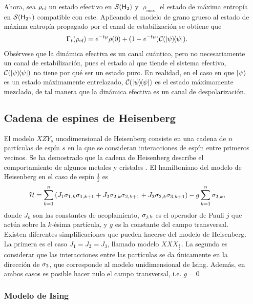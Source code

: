 Ahora, sea $\rho_{\text{ef}}$ un estado efectivo en $\mathcal{S}({\sf H}_{2})$ y $\varrho_{\max}$ el estado de máxima entropía en $\mathcal{S}({\sf H}_{2^{n}})$ compatible con este. Aplicando el modelo de grano grueso al estado de máxima entropía propagado por el canal de estabilización se obtiene que
\begin{equation}\label{eq:EffectiveStabilizing}
    \Gamma_{t}(\rho_{\ef})=e^{-t\mu}\rho(0)+(1-e^{-t \mu})\mcC(\dyad{\psi}).\nonumber
\end{equation}
Obsérvese que la dinámica efectiva es un canal cuántico, pero no necesariamente un canal de estabilización, pues el estado al que tiende el sistema efectivo, $\mcC(\dyad{\psi})$ no tiene por qué ser un estado puro. En realidad, en el caso en que $\ket{\psi}$ es un estado máximamente entrelazado, $\mcC(\dyad{\psi})$ es el estado máximamente mezclado, de tal manera que la dinámica efectiva es un canal de despolarización.

\subsection{Cadena de espines de Heisenberg}

El modelo $XZY_{s}$ unodimensional de Heisenberg consiste en una cadena de $n$ partículas de espín $s$ en la que se consideran interacciones de espín entre primeros vecinos. Se ha demostrado que la cadena de Heisenberg describe el comportamiento de algunos metales y cristales \cite{HeisenbergModel}. El hamiltoniano del modelo de Heisenberg en el caso de espín $\frac{1}{2}$ es
\begin{equation}
    \mathcal{H}=\sum_{k=1}^{n}\qty(J_{1}\sigma_{1,k}\sigma_{1,k+1}+J_{2}\sigma_{2,k}\sigma_{2,k+1}+J_{3}\sigma_{3,k}\sigma_{3,k+1})-g\sum_{k=1}^{n}\sigma_{2,k},
\end{equation}
donde $J_{k}$ son las constantes de acoplamiento, $\sigma_{j,k}$ es el operador de Pauli $j$ que actúa sobre la $k$-ésima partícula, y $g$ es la constante del campo transversal. Existen diferentes simplificaciones que pueden hacerse del modelo de Heisenberg. La primera es el caso $J_{1}=J_{2}=J_{3}$, llamado modelo $XXX_{\frac{1}{2}}$. La segunda es considerar que las interacciones entre las partículas se da únicamente en la dirección de $\sigma_{3}$, que corresponde al modelo unidimensional de Ising. Además, en ambos casos es posible hacer nulo el campo transversal, i.e. $g=0$

\subsubsection{Modelo de Ising}

